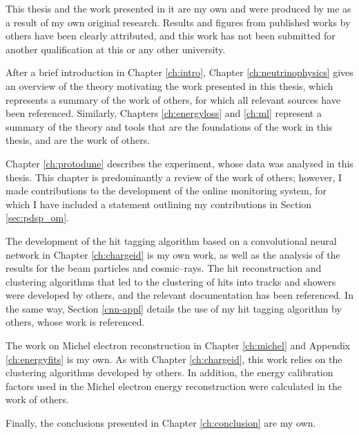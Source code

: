 This thesis and the work presented in it are my own and were produced by me as a
result of my own original research. Results and figures from published works by
others have been clearly attributed, and this work has not been submitted for
another qualification at this or any other university.

\medskip\noindent
After a brief introduction in Chapter \ref{ch:intro}, Chapter 
\ref{ch:neutrinophysics} gives an overview of the theory motivating the work 
presented in this thesis, which represents a summary of the work of others, for
which all relevant sources have been referenced. Similarly, Chapters
\ref{ch:energyloss} and \ref{ch:ml} represent a summary of the theory and tools
that are the foundations of the work in this thesis, and are the work of others.

\medskip\noindent
Chapter \ref{ch:protodune} describes the \protodune{} experiment, whose data was
analysed in this thesis. This chapter is predominantly a review of the work of
others; however, I made contributions to the development of the online 
monitoring system, for which I have included a statement outlining my 
contributions in Section \ref{sec:pdsp_om}.

\medskip\noindent
The development of the hit tagging algorithm based on a convolutional neural 
network in Chapter \ref{ch:chargeid} is my own work, as well as the analysis 
of the results for the \protodune{} beam particles and cosmic--rays. The hit 
reconstruction and clustering algorithms that led to the clustering of hits into
tracks and showers were developed by others, and the relevant documentation has 
been referenced. In the same way, Section \ref{cnn-appl} details the use of my 
hit tagging algorithm by others, whose work is referenced.

\medskip\noindent
The work on Michel electron reconstruction in Chapter \ref{ch:michel} and 
Appendix \ref{ch:energyfits} is my own. As with Chapter \ref{ch:chargeid}, this
work relies on the clustering algorithms developed by others. In addition, the 
energy calibration factors used in the Michel electron energy reconstruction
were calculated in the work of others.

\medskip\noindent
Finally, the conclusions presented in Chapter \ref{ch:conclusion} are my own.
